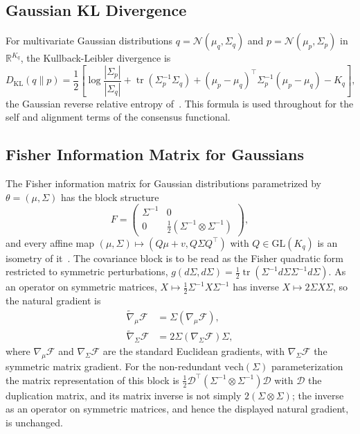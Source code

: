 \documentclass[11pt]{article}
\begin{document}
\subsection{Gaussian KL Divergence}
\label{app:gaussian_kl}

For multivariate Gaussian distributions $q = \mathcal{N}(\mu_q, \Sigma_q)$ and $p = \mathcal{N}(\mu_p, \Sigma_p)$ in $\mathbb{R}^{K_q}$, the Kullback-Leibler divergence is
\begin{equation}
D_{\mathrm{KL}}(q \| p) = \frac{1}{2}\left[\log\frac{|\Sigma_p|}{|\Sigma_q|} + \operatorname{tr}(\Sigma_p^{-1}\Sigma_q) + (\mu_p - \mu_q)^\top\Sigma_p^{-1}(\mu_p - \mu_q) - K_q\right],
\end{equation}
the Gaussian reverse relative entropy of~\cite[Ch.~G4]{DennisGaugeVFESuppG2026}. This formula is used throughout for the self and alignment terms of the consensus functional.

\subsection{Fisher Information Matrix for Gaussians}
\label{app:fisher_gaussian}

The Fisher information matrix for Gaussian distributions parametrized by $\theta = (\mu, \Sigma)$ has the block structure
\begin{equation}
F = \begin{pmatrix}
\Sigma^{-1} & 0 \\
0 & \frac{1}{2}(\Sigma^{-1} \otimes \Sigma^{-1})
\end{pmatrix},
\end{equation}
and every affine map $(\mu, \Sigma) \mapsto (Q\mu + v, Q\Sigma Q^\top)$ with $Q \in \mathrm{GL}(K_q)$ is an isometry of it~\cite[Ch.~G5, Fisher metric in the moment chart]{DennisGaugeVFESuppG2026}. The covariance block is to be read as the Fisher quadratic form restricted to symmetric perturbations, $g(d\Sigma, d\Sigma) = \tfrac{1}{2}\operatorname{tr}(\Sigma^{-1} d\Sigma \Sigma^{-1} d\Sigma)$. As an operator on symmetric matrices, $X \mapsto \tfrac{1}{2}\Sigma^{-1}X\Sigma^{-1}$ has inverse $X \mapsto 2\Sigma X \Sigma$, so the natural gradient is
\begin{align}
\tilde{\nabla}_\mu \mathcal{F} &= \Sigma (\nabla_\mu \mathcal{F}), \\
\tilde{\nabla}_\Sigma \mathcal{F} &= 2\Sigma (\nabla_\Sigma \mathcal{F}) \Sigma,
\end{align}
where $\nabla_\mu \mathcal{F}$ and $\nabla_\Sigma \mathcal{F}$ are the standard Euclidean gradients, with $\nabla_\Sigma \mathcal{F}$ the symmetric matrix gradient. For the non-redundant $\mathrm{vech}(\Sigma)$ parameterization the matrix representation of this block is $\tfrac{1}{2}\mathcal{D}^\top(\Sigma^{-1} \otimes \Sigma^{-1})\mathcal{D}$ with $\mathcal{D}$ the duplication matrix, and its matrix inverse is not simply $2(\Sigma \otimes \Sigma)$; the inverse as an operator on symmetric matrices, and hence the displayed natural gradient, is unchanged.
\end{document}
